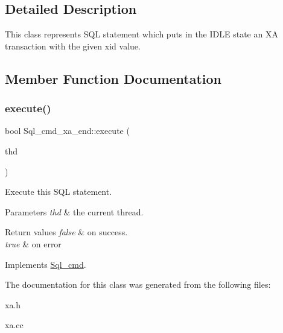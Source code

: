 \subsection{Detailed Description}
This class represents S\+QL statement which puts in the I\+D\+LE state an XA transaction with the given xid value. 

\subsection{Member Function Documentation}
\mbox{\label{classSql__cmd__xa__end_a82de55b8107137497f77ce51a9d16fad}} 
\subsubsection{\texorpdfstring{execute()}{execute()}}
{\footnotesize\ttfamily bool Sql\+\_\+cmd\+\_\+xa\+\_\+end\+::execute (\begin{DoxyParamCaption}\item[{T\+HD $\ast$}]{thd }\end{DoxyParamCaption})\hspace{0.3cm}{\ttfamily [virtual]}}

Execute this S\+QL statement. 
\begin{DoxyParams}{Parameters}
{\em thd} & the current thread. \\
\hline
\end{DoxyParams}

\begin{DoxyRetVals}{Return values}
{\em false} & on success. \\
\hline
{\em true} & on error \\
\hline
\end{DoxyRetVals}


Implements \mbox{\hyperlink{classSql__cmd_a213367b79b551296fbb7790f2a3732fb}{Sql\+\_\+cmd}}.



The documentation for this class was generated from the following files\+:\begin{DoxyCompactItemize}
\item 
xa.\+h\item 
xa.\+cc\end{DoxyCompactItemize}
